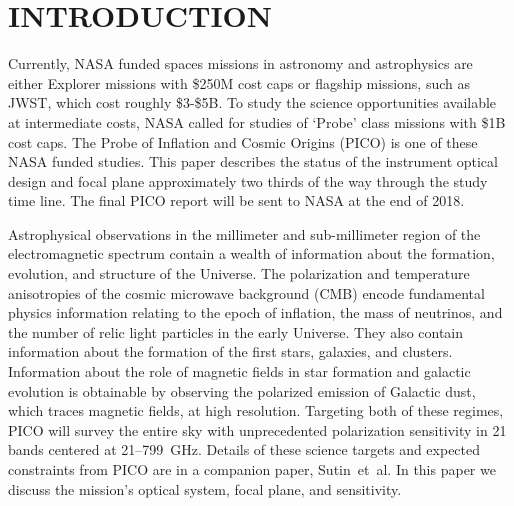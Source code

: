 \documentclass[]{spie}  %
\newcommand{\comr}[1]{\textcolor{red}{#1}}
\newcommand{\comb}[1]{\textcolor{blue}{#1}}
\begin{document}
\section{INTRODUCTION}
\label{sec:intro}  


Currently,  NASA funded spaces missions in astronomy and astrophysics are either Explorer missions with \$250M cost caps or flagship missions, 
such as JWST, which cost roughly \$3-\$5B. 
To study the science opportunities available at intermediate costs, NASA called for studies of `Probe' class missions with \$1B cost caps.  The Probe of Inflation 
and Cosmic Origins (PICO) is one of these NASA funded studies.  This paper describes the status of the instrument optical design and focal plane approximately two 
thirds of the way through the study time line.  The final PICO report will be sent to NASA at the end of 2018.


Astrophysical observations in the  millimeter and sub-millimeter region of the electromagnetic spectrum contain a wealth of 
information about the formation, evolution, and structure of the Universe.  
The polarization and temperature anisotropies of the cosmic microwave 
background (CMB) encode fundamental physics information relating to the epoch of inflation, the mass of neutrinos,  
and the number of relic light particles in the early Universe. They also contain information about the formation of 
the first stars, galaxies, and clusters.  Information about the role of magnetic fields in star formation and galactic evolution is obtainable 
by observing the polarized emission of Galactic dust, which 
traces magnetic fields, at high resolution. Targeting both of these regimes, PICO will survey the entire sky with 
unprecedented polarization sensitivity 
in 21 bands centered at 21--799~GHz.  Details of these science targets and expected constraints from PICO 
are in a companion paper, Sutin~et~al.\cite{brian_spie} 
In this paper we discuss the mission's optical system, focal plane, and sensitivity.
\end{document}
